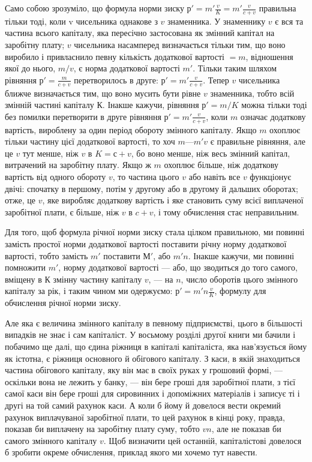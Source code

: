 Само собою зрозуміло, що формула норми зиску $р' = m' \frac{v}{K} =
m' \frac{v}{c+v}$ правильна тільки тоді, коли v чисельника однакове
з $v$ знаменника. У знаменнику $v$ є вся та частина всього капіталу,
яка пересічно застосована як змінний капітал на заробітну
плату; $v$ чисельника насамперед визначається тільки тим, що
воно виробило і привласнило певну кількість додаткової вартості
 $= m$, відношення якої до нього, $m/v$, є норма додаткової
вартості $m'$. Тільки таким шляхом рівняння $р' = \frac{m}{c + v}$ перетворилось
в друге: $р' = m' \frac{v}{c + v}$. Тепер $v$ чисельника ближче визначається
тим, що воно мусить бути рівне $v$ знаменника, тобто
всій змінній частині капіталу $К$. Інакше кажучи, рівняння
$р' = m/K$ можна тільки тоді без помилки перетворити в друге рівняння
$р' = m' \frac{v}{c + v}$, коли $m$ означає додаткову вартість, вироблену
за один період обороту змінного капіталу. Якщо $m$ охоплює
тільки частину цієї додаткової вартості, то хоч $m — m'v$ є
правильне рівняння, але це $v$ тут менше, ніж $v$ в $K = с + v$, бо
воно менше, ніж весь змінний капітал, витрачений на заробітну
плату. Якщо ж $m$ охоплює більше, ніж додаткову вартість від
одного обороту $v$, то частина цього $v$ або навіть все $v$ функціонує
двічі: спочатку в першому, потім у другому або в другому
й дальших оборотах; отже, це $v$, яке виробляє додаткову
вартість і яке становить суму всієї виплаченої заробітної плати,
є більше, ніж $v$ в $c + v$, і тому обчислення стає неправильним.

Для того, щоб формула річної норми зиску стала цілком
правильною, ми повинні замість простої норми додаткової вартості
поставити річну норму додаткової вартості, тобто замість
$m'$ поставити $М'$, або $m'n$. Інакше кажучи, ми повинні помножити
$m'$, норму додаткової вартості — або, що зводиться до
того самого, вміщену в $К$ змінну частину капіталу $v$, — на $n$,
число оборотів цього змінного капіталу за рік, і таким чином
ми одержуємо: $р' = m'n \frac{v}{K}$, формулу для обчислення річної
норми зиску.

Але яка є величина змінного капіталу в певному підприємстві,
цього в більшості випадків не знає і сам капіталіст.
У восьмому розділі другої книги ми бачили і побачимо ще
далі, що єдина ріжниця в капіталі капіталіста, яка нав’язується
йому як істотна, є ріжниця основного й обігового капіталу.
З каси, в якій знаходиться частина обігового капіталу, яку він
має в своїх руках у грошовий формі, — оскільки вона не лежить
у банку, — він бере гроші для заробітної плати, з тієї самої
каси він бере гроші для сировинних і допоміжних матеріалів
і записує ті і другі на той самий рахунок каси. А коли б йому
й довелося вести окремий рахунок виплачуваної заробітної
плати, то цей рахунок в кінці року, правда, показав би виплачену
на заробітну плату суму, тобто $vn$, але не показав би
самого змінного капіталу $v$. Щоб визначити цей останній, капіталістові
довелося б зробити окреме обчислення, приклад якого
ми хочемо тут навести.

